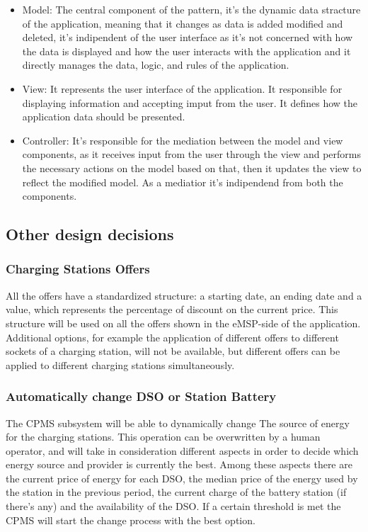 \documentclass[table, 12pt]{article}
\begin{document}
\begin{itemize}
              \begin{itemize}
                  \item Model: The central component of the pattern, it's the dynamic data stracture of the application, meaning that it changes as data is added modified and deleted, it's indipendent of the user interface as it's not concerned with how the data is displayed and how the user interacts with the application and it directly manages the data, logic, and rules of the application.
                  \item View: It represents the user interface of the application. It responsible for displaying information and accepting imput from the user. It defines how the application data should be presented.
                  \item Controller: It's responsible for the mediation between the model and view components, as it receives input from the user through the view and performs the necessary actions on the model based on that, then it updates the view to reflect the modified model. As a mediatior it's indipendend from both the components.
              \end{itemize}
    \end{itemize}

\newpage


\subsection{Other design decisions}
\label{other_design_decisions}

\subsubsection{Charging Stations Offers} 
All the offers have a standardized structure: a starting date, an ending date and a value, which represents the percentage of discount on the current price. This structure will be used on all the offers shown in the eMSP-side of the application. Additional options, for example the application of different offers to different sockets of a charging station, will not be available, but different offers can be applied to different charging stations simultaneously. 
\subsubsection{Automatically change DSO or Station Battery}
The CPMS subsystem will be able to dynamically change The source of energy for the charging stations. This operation can be overwritten by a human operator, and will take in consideration different aspects in order to decide which energy source and provider is currently the best. Among these aspects there are the current price of energy for each DSO, the median price of the energy used by the station in the previous period, the current charge of the battery station (if there's any) and the availability of the DSO. If a certain threshold is met the CPMS will start the change process with the best option.
\end{document}
